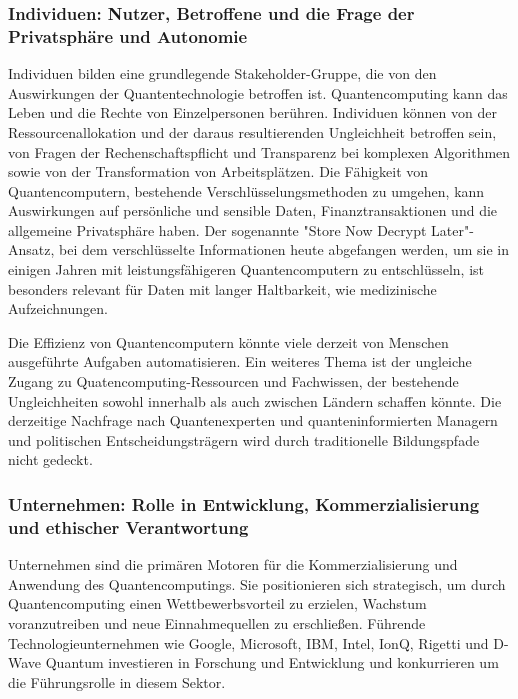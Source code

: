 \subsubsection{Individuen: Nutzer, Betroffene und die Frage der Privatsphäre und Autonomie}
Individuen bilden eine grundlegende Stakeholder-Gruppe, die von den Auswirkungen der Quantentechnologie betroffen ist. Quantencomputing kann das Leben und die Rechte von Einzelpersonen berühren. Individuen können von der Ressourcenallokation und der daraus resultierenden Ungleichheit betroffen sein, von Fragen der Rechenschaftspflicht und Transparenz bei komplexen Algorithmen sowie von der Transformation von Arbeitsplätzen.\cite{noauthor_quantum_nodate-2} Die Fähigkeit von Quantencomputern, bestehende Verschlüsselungsmethoden zu umgehen, kann Auswirkungen auf persönliche und sensible Daten, Finanztransaktionen und die allgemeine Privatsphäre haben. \cite{bond_quantum_2025} Der sogenannte "Store Now Decrypt Later"-Ansatz, bei dem verschlüsselte Informationen heute abgefangen werden, um sie in einigen Jahren mit leistungsfähigeren Quantencomputern zu entschlüsseln, ist besonders relevant für Daten mit langer Haltbarkeit, wie medizinische Aufzeichnungen.\cite{noauthor_ethics_nodate} 

Die Effizienz von Quantencomputern könnte viele derzeit von Menschen ausgeführte Aufgaben automatisieren. Ein weiteres Thema ist der ungleiche Zugang zu Quatencomputing-Ressourcen und Fachwissen, der bestehende Ungleichheiten sowohl innerhalb als auch zwischen Ländern schaffen könnte.\cite{noauthor_quantum_nodate-2} Die derzeitige Nachfrage nach Quantenexperten und quanteninformierten Managern und politischen Entscheidungsträgern wird durch traditionelle Bildungspfade nicht gedeckt.\cite{noauthor_what_nodate} 

\subsubsection{Unternehmen: Rolle in Entwicklung, Kommerzialisierung und ethischer Verantwortung}
Unternehmen sind die primären Motoren für die Kommerzialisierung und Anwendung des Quantencomputings. Sie positionieren sich strategisch, um durch Quantencomputing einen Wettbewerbsvorteil zu erzielen, Wachstum voranzutreiben und neue Einnahmequellen zu erschließen.\cite{noauthor_how_2025} Führende Technologieunternehmen wie Google, Microsoft, IBM, Intel, IonQ, Rigetti und D-Wave Quantum investieren in Forschung und Entwicklung und konkurrieren um die Führungsrolle in diesem Sektor.\cite{noauthor_europes_2025}

